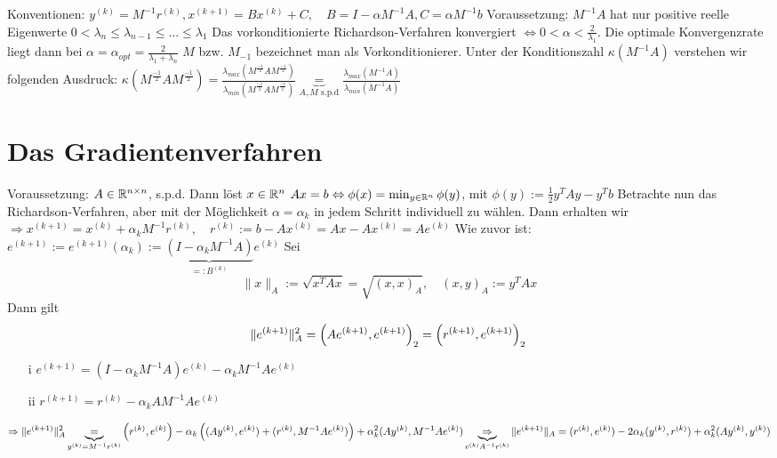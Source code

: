 
Konventionen: $y^{(k)} = M^{-1}r^{(k)}, x^{(k+1)} = Bx^{(k)} + C, \quad B=I -\alpha M^{-1}A, C=\alpha M^{-1}b$
Voraussetzung: $M^{-1}A$ hat nur positive reelle Eigenwerte $0<\lambda_n \leq \lambda_{n-1}\leq \dots \leq \lambda_1$
Das vorkonditionierte Richardson-Verfahren konvergiert $\Leftrightarrow 0<\alpha<\frac{2}{\lambda_1}$. Die optimale Konvergenzrate liegt dann bei $\alpha=\alpha_{opt} = \frac{2}{\lambda_1+\lambda_n}$
$M$ bzw. $M_{-1}$ bezeichnet man als Vorkonditionierer. Unter der Konditionszahl $\kappa\left( M^{-1}A \right)$ verstehen wir folgenden Ausdruck: $\kappa\left( M^{\frac{-1}{2}} A M^{\frac{-1}{2}} \right) = \frac{\lambda_{max}\left(  M^{\frac{-1}{2}} A M^{\frac{-1}{2}}  \right)}{\lambda_{min}\left(  M^{\frac{-1}{2}} A M^{\frac{-1}{2}}  \right)} \underbrace{=}_{A,M \text{ s.p.d}} \frac{\lambda_{max}(M^{-1}A)}{\lambda_{min}(M^{-1}A)}$

\section{Das Gradientenverfahren}
Voraussetzung: $A\in\mathbb{R}^{n\times n}$, s.p.d.
Dann löst $x\in\mathbb{R}^n$ $Ax=b \Leftrightarrow \phi(x) = \min_{y\in\mathbb{R}^n} \phi(y)$, mit $\phi(y) := \frac12 y^TAy - y^Tb$
Betrachte nun das Richardson-Verfahren, aber mit der Möglichkeit $\alpha=\alpha_k$ in jedem Schritt individuell zu wählen. Dann erhalten wir 
$\Rightarrow x^{(k+1)} = x^{(k)} + \alpha_k M^{-1}r^{(k)}, \quad r^{(k)}:=b-Ax^{(k)} =Ax-Ax^{(k)} = Ae^{(k)}$
Wie zuvor ist: $e^{(k+1)}:= e^{(k+1)}(\alpha_k):=\underbrace{\left( I-\alpha_k M^{-1}A \right)}_{=:B^{(k)}}e^{(k)}$
Sei 
\begin{equation}
  \|x\|_A := \sqrt{x^TAx} = \sqrt{(x,x)_A},\quad (x,y)_A := y^TAx
  \label{}
\end{equation}
Dann gilt
\begin{equation}
  \|e^{(k+1)}\|_A^2 = \left( Ae^{(k+1)}, e^{(k+1)} \right)_2 = \left( r^{(k+1)}, e^{(k+1)} \right)_2\\
  \label{}
\end{equation}
\begin{itemize}
  \item[i] $e^{(k+1)} = \left( I-\alpha_kM^{-1}A \right)e^{(k)} -\alpha_kM^{-1}Ae^{(k)}$
  \item[ii] $r^{(k+1)} = r^{(k)}-\alpha_kAM^{-1}Ae^{(k)}$  
\end{itemize}
\begin{equation}
  \Rightarrow \|e^{(k+1)}\|_A^2 \underbrace{=}_{y^{(k)} = M^{-1}r^{(k)}} \left( r^{(k)}, e^{(k)} \right) -\alpha_k \left( (Ay^{(k)},e^{(k)}) + (r^{(k)},M^{-1}Ae^{(k)}) \right) + \alpha_k^2 (Ay^{(k)}, M^{-1}Ae^{(k)})\\
  \underbrace{\Rightarrow}_{e^{(k)}A^{-1}r^{(k)}} \|e^{(k+1)}\|_A = (r^{(k)},e^{(k)}) - 2\alpha_k (y^{(k)},r^{(k)}) + \alpha_k^2 (Ay^{(k)}, y^{(k)})
  \label{}
\end{equation}

